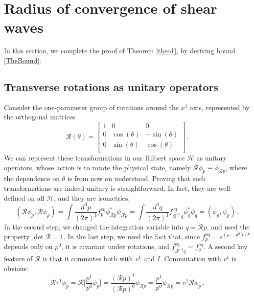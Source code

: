 \documentclass[a4paper, amsfonts, amssymb, amsmath, reprint, showkeys, nofootinbib, twoside, onecolumn,notitlepage]{revtex4-2}
\theoremstyle{definition}
\theoremstyle{theorem}
\theoremstyle{corollary}
\begin{document}
\section{Radius of convergence of shear waves}\label{shearone}

In this section, we complete the proof of Theorem \ref{theo1}, by deriving bound \eqref{TheBound}.


\subsection{Transverse rotations as unitary operators}

Consider the one-parameter group of rotations around the $x^1$ axis, represented by the orthogonal matrices
\begin{equation}
    \mathcal{R}(\theta) =
    \begin{bmatrix}
1 & 0 & 0 \\
0 & \cos(\theta) & -\sin(\theta) \\
0 & \sin(\theta) & \cos(\theta) \\ 
    \end{bmatrix} \, .
\end{equation}
We can represent these transformations in our Hilbert space $\mathcal{H}$ as unitary operators, whose action is to rotate the physical state, namely $\mathcal{R}\phi_p \equiv \phi_{\mathcal{R}p}$, where the dependence on $\theta$ is from now on understood. Proving that such transformations are indeed unitary is straightforward. In fact, they are well defined on all $\mathcal{H}$, and they are isometries:
\begin{equation}
(\mathcal{R}\phi_p,\mathcal{R}\psi_p)= \int \dfrac{d^3 p}{(2\pi)^3} f_p^{\text{eq}} \phi^*_{\mathcal{R}p} \psi_{\mathcal{R}p} = \int \dfrac{d^3 q}{(2\pi)^3} f_{\mathcal{R}^{-1}q}^{\text{eq}} \phi^*_{q} \psi_{q}=(\phi_p,\psi_p) \, .
\end{equation}
In the second step, we changed the integration variable into $q=\mathcal{R}p$, and used the property $\det \mathcal{R}=1$. In the last step, we used the fact that, since $f^{\text{eq}}_p=e^{(\mu-p^0)/T}$ depends only on $p^0$, it is invariant under rotations, and $f_{\mathcal{R}^{-1}q}^{\text{eq}}=f_{q}^{\text{eq}}$. A second key feature of  $\mathcal{R}$ is that it commutes both with $v^1$ and $I$. Commutation with $v^1$ is obvious:
\begin{equation}
    \mathcal{R}v^1\phi_p= \mathcal{R} \bigg[ \dfrac{p^1}{p^0} \phi_p \bigg] = \dfrac{(\mathcal{R}p)^1}{(\mathcal{R}p)^0}\phi_{\mathcal{R}p} = \dfrac{p^1}{p^0}\phi_{\mathcal{R}p}= v^1 \mathcal{R}\phi_p \, .
\end{equation}
\end{document}
